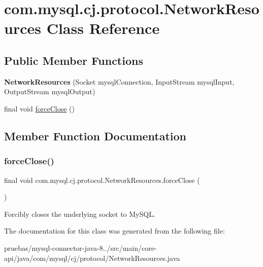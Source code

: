 \hypertarget{classcom_1_1mysql_1_1cj_1_1protocol_1_1_network_resources}{}\section{com.\+mysql.\+cj.\+protocol.\+Network\+Resources Class Reference}
\label{classcom_1_1mysql_1_1cj_1_1protocol_1_1_network_resources}
\subsection*{Public Member Functions}
\begin{DoxyCompactItemize}
\item 
\mbox{\label{classcom_1_1mysql_1_1cj_1_1protocol_1_1_network_resources_ac38ac7ef65ea97cc46672d9a60184105}} 
{\bfseries Network\+Resources} (Socket mysql\+Connection, Input\+Stream mysql\+Input, Output\+Stream mysql\+Output)
\item 
final void \mbox{\hyperlink{classcom_1_1mysql_1_1cj_1_1protocol_1_1_network_resources_a2a216e31a2398da5270533a50142eb40}{force\+Close}} ()
\end{DoxyCompactItemize}


\subsection{Member Function Documentation}
\mbox{\label{classcom_1_1mysql_1_1cj_1_1protocol_1_1_network_resources_a2a216e31a2398da5270533a50142eb40}} 
\subsubsection{\texorpdfstring{force\+Close()}{forceClose()}}
{\footnotesize\ttfamily final void com.\+mysql.\+cj.\+protocol.\+Network\+Resources.\+force\+Close (\begin{DoxyParamCaption}{ }\end{DoxyParamCaption})}

Forcibly closes the underlying socket to My\+S\+QL. 

The documentation for this class was generated from the following file\+:\begin{DoxyCompactItemize}
\item 
pruebas/mysql-\/connector-\/java-\/8../src/main/core-\/api/java/com/mysql/cj/protocol/Network\+Resources.\+java\end{DoxyCompactItemize}
